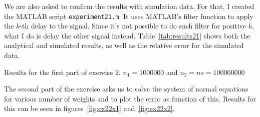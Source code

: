 We are also asked to confirm the results with simulation data. For that, I created
the MATLAB script {\tt experiment21.m}. It uses MATLAB's filter function to apply
the \(k\)-th delay to the signal. Since it's not possible to do such filter for
positive \(k\), what I do is delay the other signal instead.
Table~\ref{tab:results21} shows both the analytical and simulated results, as well
as the relative error for the simulated data.

\begin{table}
    \caption{Results for the first part of exercise 2. \(n_1=1000000\)
        and \(n_2=ns = 100000000\)\label{tab:results21}}
\end{table}

The second part of the exercise asks us to solve the system of normal equations
for various number of weights and to plot the error as function of this. Results
for this can be seen in figures~\ref{fig:ex22x1} and~\ref{fig:ex22x2}.
